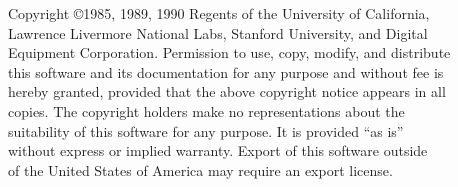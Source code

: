 \documentclass[letterpaper,twoside,12pt]{article}
\begin{document}
\pagestyle{empty}


\begin{center}
\vspace*{6.0in}
Copyright \copyright 1985, 1989, 1990 Regents of the University of California, \\
Lawrence Livermore National Labs, Stanford University, and Digital \\
Equipment Corporation.  Permission to use, copy, modify, and distribute \\
this software and its documentation for any purpose and without fee is \\
hereby granted, provided that the above copyright notice appears in all \\
copies.  The copyright holders make no representations about the \\
suitability of this software for any purpose.  It is provided ``as is'' \\
without express or implied warranty.  Export of this software outside \\
of the United States of America may require an export license.
\end{center}
\end{document}
